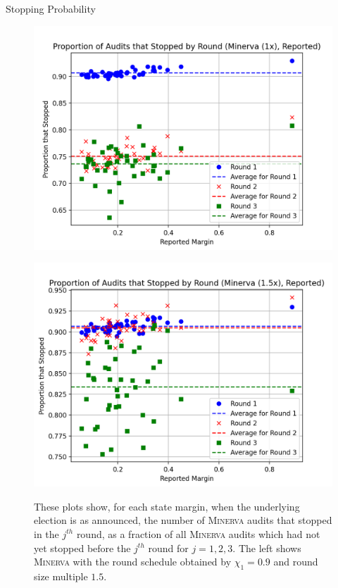 \documentclass[final]{beamer}
\newcommand{\Minerva}{\textsc{Minerva}\xspace}
\newlength{\colwidth}
\begin{document}
\begin{frame}[t]
\begin{columns}[t]
\begin{column}{\colwidth}
\begin{block}{Stopping Probability}
\begin{figure}[h]
\centering
\begin{minipage}{.49\textwidth}
\includegraphics[width=1\textwidth]{minerva_multiround_1x_10^4/sprobs_first_three.png}
\label{fig:minerva1_sprob}
\end{minipage}
\begin{minipage}{.49\textwidth}
\includegraphics[width=1\textwidth]{minerva_multiround_1p5x_10^4/sprobs_first_three.png}
\label{fig:minerva1p5_sprob}
\end{minipage}
\caption{These plots show, for each state margin, when the underlying election is as announced, the number of \Minerva audits that stopped in the $j^{th}$ round, as a fraction of all \Minerva audits which had not yet stopped before the $j^{th}$ round for $j=1,2,3$. The left shows \Minerva with the round schedule obtained by $\chi_1=0.9$ and round size multiple $1.5$.}
\end{figure}


\end{block}
\end{column}
\end{columns}
\end{frame}
\end{document}
